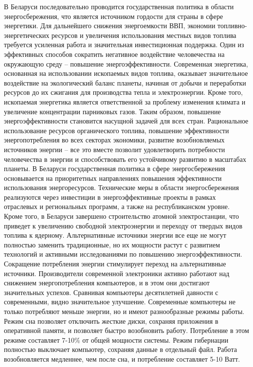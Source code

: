 В Беларуси последовательно проводится государственная политика в области энергосбережения, что является источником гордости для страны в сфере энергетики. Для дальнейшего снижения энергоемкости ВВП, экономии топливно-энергетических ресурсов и увеличения использования местных видов топлива требуется усиленная работа и значительная инвестиционная поддержка.
Один из эффективных способов сократить негативное воздействие человечества на окружающую среду – повышение энергоэффективности. Современная энергетика, основанная на использовании ископаемых видов топлива, оказывает значительное воздействие на экологический баланс планеты, начиная от добычи и переработки ресурсов до их сжигания для производства тепла и электроэнергии. Кроме того, ископаемая энергетика является ответственной за проблему изменения климата и увеличение концентрации парниковых газов. Таким образом, повышение энергоэффективности становится насущной задачей для всех стран.
Рациональное использование ресурсов органического топлива, повышение эффективности энергопотребления во всех секторах экономики, развитие возобновляемых источников энергии – все это вместе позволит удовлетворить потребности человечества в энергии и способствовать его устойчивому развитию в масштабах планеты.
В Беларуси государственная политика в сфере энергосбережения основывается на приоритетных направлениях повышения эффективности использования энергоресурсов. Технические меры в области энергосбережения реализуются через инвестиции в энергоэффективные проекты в рамках отраслевых и региональных программ, а также на республиканском уровне. Кроме того, в Беларуси завершено строительство атомной электростанции, что приведет к увеличению свободной электроэнергии и переходу от твердых видов топлива к ядерному. Альтернативные источники энергии все еще не могут полностью заменить традиционные, но их мощности растут с развитием технологий и активными исследованиями по повышению энергоэффективности. Сокращение потребления энергии стимулирует переход на альтернативные источники.
Производители современной электроники активно работают над снижением энергопотребления компьютеров, и в этом они достигают значительных успехов. Сравнивая компьютеры десятилетней давности с современными, видно значительное улучшение. Современные компьютеры не только потребляют меньше энергии, но и имеют разнообразные режимы работы.
Режим сна позволяет отключить жесткие диски, сохраняя приложения в оперативной памяти, и позволяет быстро возобновить работу. Потребление в этом режиме составляет 7-10\% от общей мощности системы.
Режим гибернации полностью выключает компьютер, сохраняя данные в отдельный файл. Работа возобновляется медленнее, чем после сна, и потребление составляет 5-10 Ватт.
